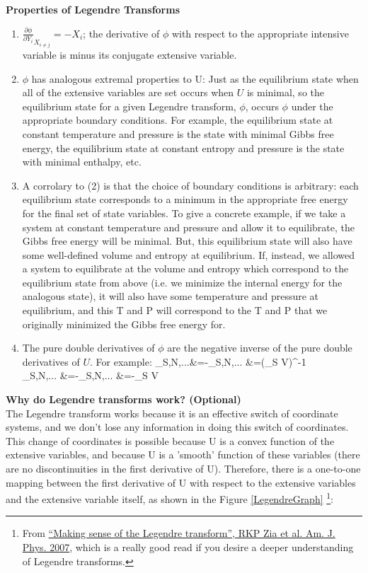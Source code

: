 \documentclass[12pt]{article}
\begin{document}
\textbf{Properties of Legendre Transforms}\\
\begin{enumerate}
\item $\frac{\partial \phi}{\partial Y_i}_{X_{i\neq j}}=-X_i$; the derivative of $\phi$ with respect to the appropriate intensive variable is minus its conjugate extensive variable.
\item $\phi$ has analogous extremal properties to U: Just as the equilibrium state when all of the extensive variables are set occurs when $U$ is minimal, so the equilibrium state for a given Legendre transform, $\phi$, occurs $\phi$ under the appropriate boundary conditions. For example, the equilibrium state at constant temperature and pressure is the state with minimal Gibbs free energy, the equilibrium state at constant entropy and pressure is the state with minimal enthalpy, etc. 
\item A corrolary to (2) is that the choice of boundary conditions is arbitrary: each equilibrium state corresponds to a minimum in the appropriate free energy for the final set of state variables. To give a concrete example, if we take a system at constant temperature and pressure and allow it to equilibrate, the Gibbs free energy will be minimal. But, this equilibrium state will also have some well-defined volume and entropy at equilibrium. If, instead, we allowed a system to equilibrate at the volume and entropy which correspond to the equilibrium state from above (i.e. we minimize the internal energy for the analogous state), it will also have some temperature and pressure at equilibrium, and this T and P will correspond to the T and P that we originally minimized the Gibbs free energy for.
\item The pure double derivatives of $\phi$ are the negative inverse of the pure double derivatives of $U$. For example:
 \eqs {}_{S,N,...}&=-_{S,N,...} &=(\beta_S V)^{-1}\\
 _{S,N,...} &=-_{S,N,...} &=-\beta_S V \eqe
\end{enumerate}

\textbf{Why do Legendre transforms work? (Optional)}\\
The Legendre transform works because it is an effective switch of coordinate systems, and we don't lose any information in doing this switch of coordinates. This change of coordinates is possible because U is a convex function of the extensive variables, and because U is a 'smooth' function of these variables (there are no discontinuities in the first derivative of U). Therefore, there is a one-to-one mapping between the first derivative of U with respect to the extensive variables and the extensive variable itself, as shown in the Figure \ref{LegendreGraph} \footnote{From \href{http://dx.doi.org/10.1119/1.3119512}{``Making sense of the Legendre transform'', RKP Zia et al. Am. J. Phys. 2007}, which is a really good read if you desire a deeper understanding of Legendre transforms.}:
\end{document}
